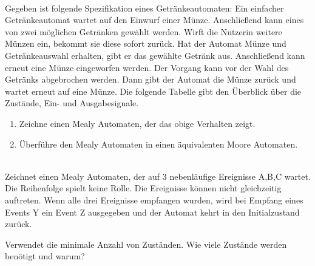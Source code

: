 \\
Gegeben ist folgende Spezifikation eines Getränkeautomaten:
Ein einfacher Getränkeautomat wartet auf den Einwurf einer Münze. Anschließend kann eines von zwei möglichen
Getränken gewählt werden. Wirft die Nutzerin weitere Münzen ein, bekommt sie diese sofort zurück. Hat der
Automat Münze und Getränkeauswahl erhalten, gibt er das gewählte Getränk aus. Anschließend kann erneut
eine Münze eingeworfen werden. Der Vorgang kann vor der Wahl des Getränks abgebrochen werden. Dann gibt
der Automat die Münze zurück und wartet erneut auf eine Münze.
Die folgende Tabelle gibt den Überblick über die Zustände, Ein- und Ausgabesignale.
\begin{table}[h]
\centering
\renewcommand{\arraystretch}{1.2}
\end{table}
\begin{enumerate}
    \item Zeichne einen Mealy Automaten, der das obige Verhalten zeigt.
    \item Überführe den Mealy Automaten in einen äquivalenten Moore Automaten.
    
    
\end{enumerate}

\\
Zeichnet einen Mealy Automaten, der auf 3 nebenläufige Ereignisse A,B,C wartet. Die Reihenfolge spielt keine
Rolle. Die Ereignisse können nicht gleichzeitig auftreten. Wenn alle drei Ereignisse empfangen wurden, wird bei
Empfang eines Events Y ein Event Z ausgegeben und der Automat kehrt in den Initialzustand zurück.

Verwendet die minimale Anzahl von Zuständen. Wie viele Zustände werden benötigt und warum?

